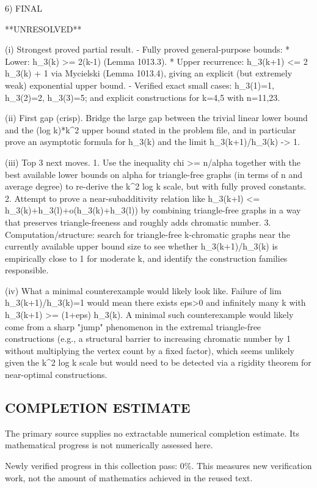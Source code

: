 6) FINAL

**UNRESOLVED**

(i) Strongest proved partial result.
- Fully proved general-purpose bounds:
  * Lower: h_3(k) >= 2(k-1) (Lemma 1013.3).
  * Upper recurrence: h_3(k+1) <= 2 h_3(k) + 1 via Mycielski (Lemma 1013.4), giving an explicit (but extremely weak) exponential upper bound.
- Verified exact small cases: h_3(1)=1, h_3(2)=2, h_3(3)=5; and explicit constructions for k=4,5 with n=11,23.

(ii) First gap (crisp).
Bridge the large gap between the trivial linear lower bound and the (log k)*k^2 upper bound stated in the problem file, and in particular prove an asymptotic formula for h_3(k) and the limit h_3(k+1)/h_3(k) -> 1.

(iii) Top 3 next moves.
1. Use the inequality chi >= n/alpha together with the best available lower bounds on alpha for triangle-free graphs (in terms of n and average degree) to re-derive the k^2 log k scale, but with fully proved constants.
2. Attempt to prove a near-subadditivity relation like h_3(k+l) <= h_3(k)+h_3(l)+o(h_3(k)+h_3(l)) by combining triangle-free graphs in a way that preserves triangle-freeness and roughly adds chromatic number.
3. Computation/structure: search for triangle-free k-chromatic graphs near the currently available upper bound size to see whether h_3(k+1)/h_3(k) is empirically close to 1 for moderate k, and identify the construction families responsible.

(iv) What a minimal counterexample would likely look like.
Failure of lim h_3(k+1)/h_3(k)=1 would mean there exists eps>0 and infinitely many k with h_3(k+1) >= (1+eps) h_3(k). A minimal such counterexample would likely come from a sharp "jump" phenomenon in the extremal triangle-free constructions (e.g., a structural barrier to increasing chromatic number by 1 without multiplying the vertex count by a fixed factor), which seems unlikely given the k^2 log k scale but would need to be detected via a rigidity theorem for near-optimal constructions.



\subsection*{COMPLETION ESTIMATE}
The primary source supplies no extractable numerical completion estimate. Its mathematical progress is not numerically assessed here.

Newly verified progress in this collection pass: $0\%$. This measures new verification work, not the amount of mathematics achieved in the reused text.
